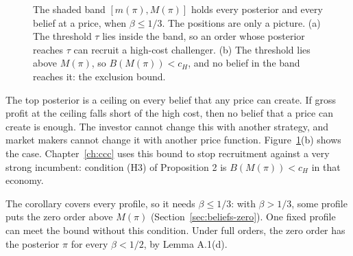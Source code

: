 \begin{figure}[ht]
\centering
{}
\caption{The shaded band \([m(\pi),M(\pi)]\) holds every posterior and every belief at a price, when \(\beta\le1/3\). The positions are only a picture. (a) The threshold \(\tau\) lies inside the band, so an order whose posterior reaches \(\tau\) can recruit a high-cost challenger. (b) The threshold lies above \(M(\pi)\), so \(B(M(\pi))<c_H\), and no belief in the band reaches it: the exclusion bound.}
\label{fig:beliefs-band}
\end{figure}

\begin{intuition}
The top posterior is a ceiling on every belief that any price can create. If gross profit at the ceiling falls short of the high cost, then no belief that a price can create is enough. The investor cannot change this with another strategy, and market makers cannot change it with another price function. Figure~\ref{fig:beliefs-band}(b) shows the case. Chapter~\ref{ch:ccc} uses this bound to stop recruitment against a very strong incumbent: condition (H3) of Proposition 2 is \(B(M(\pi))<c_H\) in that economy.
\end{intuition}

\begin{watchout}
The corollary covers every profile, so it needs \(\beta\le1/3\): with \(\beta>1/3\), some profile puts the zero order above \(M(\pi)\) (Section~\ref{sec:beliefs-zero}). One fixed profile can meet the bound without this condition. Under full orders, the zero order has the posterior \(\pi\) for every \(\beta<1/2\), by Lemma A.1(d).
\end{watchout}

